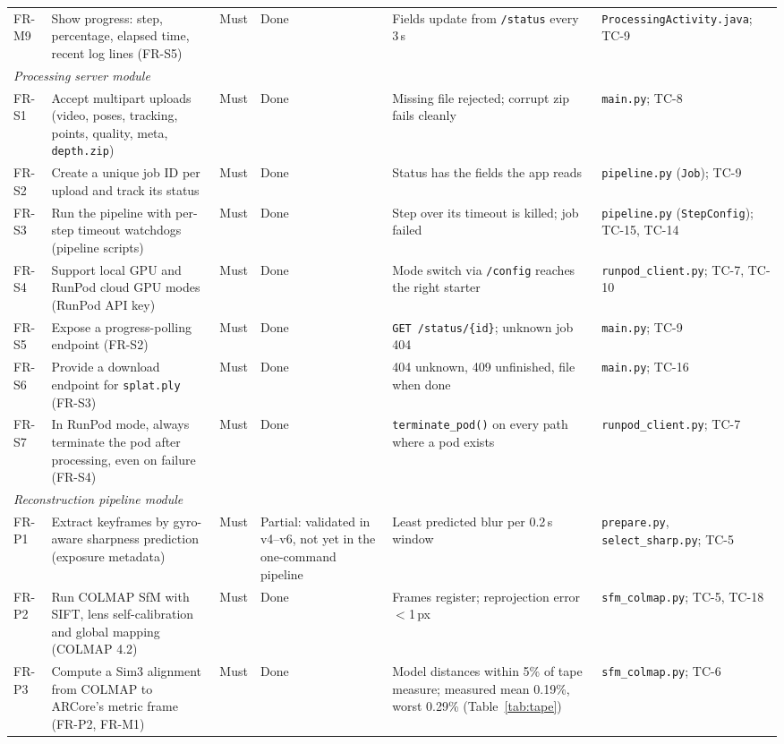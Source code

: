 {\begin{longtable}{p{}p{}p{}p{}p{}p{}}
FR-M9 & Show progress: step, percentage, elapsed time, recent log lines (FR-S5) & Must & Done & Fields update from \texttt{/status} every 3\,s & \texttt{ProcessingActivity.java}; TC-9 \\
\multicolumn{6}{l}{\textit{Processing server module}} \\
FR-S1 & Accept multipart uploads (video, poses, tracking, points, quality, meta, \texttt{depth.zip}) & Must & Done & Missing file rejected; corrupt zip fails cleanly & \texttt{main.py}; TC-8 \\
FR-S2 & Create a unique job ID per upload and track its status & Must & Done & Status has the fields the app reads & \texttt{pipeline.py} (\texttt{Job}); TC-9 \\
FR-S3 & Run the pipeline with per-step timeout watchdogs (pipeline scripts) & Must & Done & Step over its timeout is killed; job failed & \texttt{pipeline.py} (\texttt{StepConfig}); TC-15, TC-14 \\
FR-S4 & Support local GPU and RunPod cloud GPU modes (RunPod API key) & Must & Done & Mode switch via \texttt{/config} reaches the right starter & \texttt{runpod\_client.py}; TC-7, TC-10 \\
FR-S5 & Expose a progress-polling endpoint (FR-S2) & Must & Done & \texttt{GET /status/\{id\}}; unknown job 404 & \texttt{main.py}; TC-9 \\
FR-S6 & Provide a download endpoint for \texttt{splat.ply} (FR-S3) & Must & Done & 404 unknown, 409 unfinished, file when done & \texttt{main.py}; TC-16 \\
FR-S7 & In RunPod mode, always terminate the pod after processing, even on failure (FR-S4) & Must & Done & \texttt{terminate\_pod()} on every path where a pod exists & \texttt{runpod\_client.py}; TC-7 \\
\multicolumn{6}{l}{\textit{Reconstruction pipeline module}} \\
FR-P1 & Extract keyframes by gyro-aware sharpness prediction (exposure metadata) & Must & Partial: validated in v4--v6, not yet in the one-command pipeline & Least predicted blur per 0.2\,s window & \texttt{prepare.py}, \texttt{select\_sharp.py}; TC-5 \\
FR-P2 & Run COLMAP SfM with SIFT, lens self-calibration and global mapping (COLMAP 4.2) & Must & Done & Frames register; reprojection error $<$1\,px & \texttt{sfm\_colmap.py}; TC-5, TC-18 \\
FR-P3 & Compute a Sim3 alignment from COLMAP to ARCore's metric frame (FR-P2, FR-M1) & Must & Done & Model distances within 5\% of tape measure; measured mean 0.19\%, worst 0.29\% (Table~\ref{tab:tape}) & \texttt{sfm\_colmap.py}; TC-6 \\

\end{longtable}}

